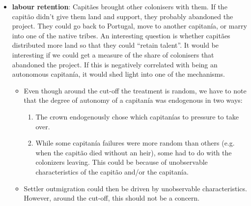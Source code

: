 \documentclass[11pt,a4paper]{article}
\begin{document}
\begin{itemize}
		\item \textbf{\textcite{Domar1970} labour retention}: Capit\~aes brought other colonisers with them. If the capit\~ao didn't give them land and support, they probably abandoned the project. They could go back to Portugal, move to another capitan\'ia, or marry into one of the native tribes. An interesting question is whether capit\~aes distributed more land so that they could ``retain talent''. It would be interesting if we could get a measure of the share of colonisers that abandoned the project. If this is negatively correlated with being an autonomous capitan\'ia, it would shed light into one of the mechanisms.
		\begin{itemize}
			\item Even though around the cut-off the treatment is random, we have to note that the degree of autonomy of a capitan\'ia was endogenous in two ways:
			\begin{enumerate}
				\item The crown endogenously chose which capitan\'ias to pressure to take over.
				\item While some capitan\'ia failures were more random than others (e.g. when the capit\~ao died without an heir), some had to do with the colonizers leaving. This could be because of unobservable characteristics of the capit\~ao and/or the capitan\'ia.
			\end{enumerate}
			\item Settler outmigration could then be driven by unobservable characteristics. However, around the cut-off, this should not be a concern.
		\end{itemize}
	\end{itemize}
	\clearpage
	\printbibliography
	
\end{document}
